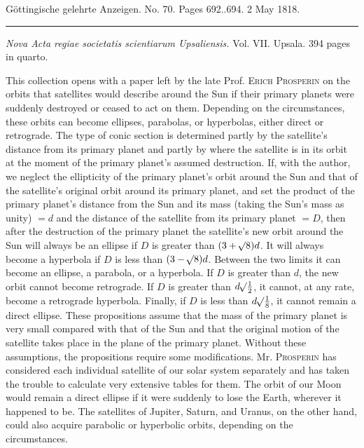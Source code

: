 \clearpage
{}
\hypertarget{native-609-lower}{}
\begin{center}\small Göttingische gelehrte Anzeigen. No. 70. Pages 692..694. 2 May 1818.\\[3pt]\rule{.72\linewidth}{.3pt}\end{center}

\emph{Nova Acta regiae societatis scientiarum Upsaliensis.} Vol. VII. Upsala. 394 pages in quarto.

\begingroup{}\relax
This collection opens with a paper left by the late Prof. \textsc{Erich Prosperin} on the orbits that satellites would describe around the Sun if their primary planets were suddenly destroyed or ceased to act on them.
Depending on the circumstances, these orbits can become ellipses, parabolas, or hyperbolas, either direct or retrograde.
The type of conic section is determined partly by the satellite's distance from its primary planet and partly by where the satellite is in its orbit at the moment of the primary planet's assumed destruction.
If, with the author, we neglect the ellipticity of the primary planet's orbit around the Sun and that of the satellite's original orbit around its primary planet, and set the product of the primary planet's distance from the Sun and its mass (taking the Sun's mass as unity) $= d$ and the distance of the satellite from its primary planet $= D$, then after the destruction of the primary planet the satellite's new orbit around the Sun will always be an ellipse if $D$ is greater than $(3+\mathord{{}^{}\!\surd}8)d$.
It will always become a hyperbola if $D$ is less than $(3-\mathord{{}^{}\!\surd}8)d$.
Between the two limits it can become an ellipse, a parabola, or a hyperbola.
If $D$ is greater than $d$, the new orbit cannot become retrograde.
If $D$ is greater than $d\mathord{{}^{}\!\surd}\tfrac{1}{2}$, it cannot, at any rate, become a retrograde hyperbola.
Finally, if $D$ is less than $d\mathord{{}^{}\!\surd}\tfrac{1}{8}$, it cannot remain a direct ellipse.
These propositions assume that the mass of the primary planet is very small compared with that of the Sun and that the original motion of the satellite takes place in the plane of the primary planet. Without these assumptions, the propositions require some modifications.
Mr. \textsc{Prosperin} has considered each individual satellite of our solar system separately and has taken the trouble to calculate very extensive tables for them.
The orbit of our Moon would remain a direct ellipse if it were suddenly to lose the Earth, wherever it happened to be. The satellites of Jupiter, Saturn, and Uranus, on the other hand, could also acquire parabolic or hyperbolic orbits, depending on the circumstances.
